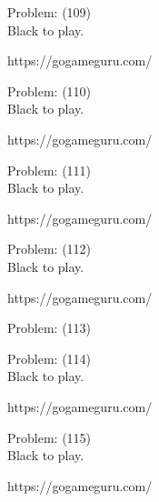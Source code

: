 \documentclass[11pt]{article}
\begin{document}
\begin{minipage}[t]{0.5\textwidth}
  {\centering
  
  Problem: (109)\\
  Black to play.

https://gogameguru.com/\\
  }
\end{minipage}
\begin{minipage}[t]{0.5\textwidth}
  {\centering
  
  Problem: (110)\\
  Black to play.

https://gogameguru.com/\\
  }
\end{minipage}
\begin{minipage}[t]{0.5\textwidth}
  {\centering
  
  Problem: (111)\\
  Black to play.

https://gogameguru.com/\\
  }
\end{minipage}
\begin{minipage}[t]{0.5\textwidth}
  {\centering
  
  Problem: (112)\\
  Black to play.

https://gogameguru.com/\\
  }
\end{minipage}
\begin{minipage}[t]{0.5\textwidth}
  {\centering
  
  Problem: (113)\\
  
  }
\end{minipage}
\begin{minipage}[t]{0.5\textwidth}
  {\centering
  
  Problem: (114)\\
  Black to play.

https://gogameguru.com/\\
  }
\end{minipage}
\begin{minipage}[t]{0.5\textwidth}
  {\centering
  
  Problem: (115)\\
  Black to play.

https://gogameguru.com/\\
  }
\end{minipage}
\end{document}

